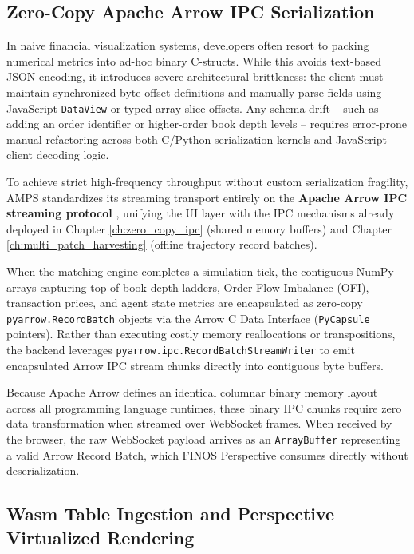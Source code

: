 \subsection{Zero-Copy Apache Arrow IPC Serialization}

In naive financial visualization systems, developers often resort to packing numerical metrics into ad-hoc binary C-structs. While this avoids text-based JSON encoding, it introduces severe architectural brittleness: the client must maintain synchronized byte-offset definitions and manually parse fields using JavaScript \texttt{DataView} or typed array slice offsets. Any schema drift -- such as adding an order identifier or higher-order book depth levels -- requires error-prone manual refactoring across both C/Python serialization kernels and JavaScript client decoding logic.

To achieve strict high-frequency throughput without custom serialization fragility, AMPS standardizes its streaming transport entirely on the \textbf{Apache Arrow IPC streaming protocol} \cite{apache_arrow_c_data}, unifying the UI layer with the IPC mechanisms already deployed in Chapter \ref{ch:zero_copy_ipc} (shared memory buffers) and Chapter \ref{ch:multi_patch_harvesting} (offline trajectory record batches).

When the matching engine completes a simulation tick, the contiguous NumPy arrays capturing top-of-book depth ladders, Order Flow Imbalance (OFI), transaction prices, and agent state metrics are encapsulated as zero-copy \texttt{pyarrow.RecordBatch} objects via the Arrow C Data Interface (\texttt{PyCapsule} pointers). Rather than executing costly memory reallocations or transpositions, the backend leverages \texttt{pyarrow.ipc.RecordBatchStreamWriter} to emit encapsulated Arrow IPC stream chunks directly into contiguous byte buffers. 

Because Apache Arrow defines an identical columnar binary memory layout across all programming language runtimes, these binary IPC chunks require zero data transformation when streamed over WebSocket frames. When received by the browser, the raw WebSocket payload arrives as an \texttt{ArrayBuffer} representing a valid Arrow Record Batch, which FINOS Perspective consumes directly without deserialization.

\subsection{Wasm Table Ingestion and Perspective Virtualized Rendering}

